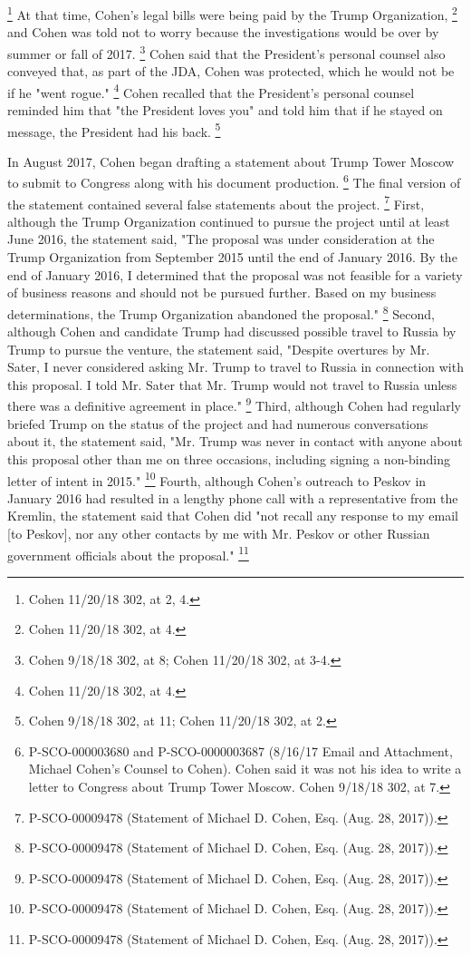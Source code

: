 {\footnote{Cohen 11/20/18 302, at 2, 4.}
At that time, Cohen's legal bills were being paid by the Trump Organization,%
\footnote{Cohen 11/20/18 302, at 4.}
and Cohen was told not to worry because the investigations would be over by summer or fall of 2017.%
\footnote{Cohen 9/18/18 302, at 8;
Cohen 11/20/18 302, at 3-4.}
Cohen said that the President's personal counsel also conveyed that, as part of the JDA, Cohen was protected, which he would not be if he "went rogue."%
\footnote{Cohen 11/20/18 302, at 4.}
Cohen recalled that the President's personal counsel reminded him that "the President loves you" and told him that if he stayed on message, the President had his back.%
\footnote{Cohen 9/18/18 302, at 11;
Cohen 11/20/18 302, at 2.}

In August 2017, Cohen began drafting a statement about Trump Tower Moscow to submit to Congress along with his document production.%
\footnote{P-SCO-000003680 and P-SCO-0000003687 (8/16/17 Email and Attachment, Michael Cohen’s Counsel to Cohen).
Cohen said it was not his idea to write a letter to Congress about Trump Tower Moscow.
Cohen 9/18/18 302, at 7.}
The final version of the statement contained several false statements about the project.%
\footnote{P-SCO-00009478 (Statement of Michael D. Cohen, Esq. (Aug. 28, 2017)).}
First, although the Trump Organization continued to pursue the project until at least June 2016, the statement said, "The proposal was under consideration at the Trump Organization from September 2015 until the end of January 2016.
By the end of January 2016, I determined that the proposal was not feasible for a variety of business reasons and should not be pursued further.
Based on my business determinations, the Trump Organization abandoned the proposal."%
\footnote{P-SCO-00009478 (Statement of Michael D. Cohen, Esq. (Aug. 28, 2017)).}
Second, although Cohen and candidate Trump had discussed possible travel to Russia by Trump to pursue the venture, the statement said, "Despite overtures by Mr. Sater, I never considered asking Mr. Trump to travel to Russia in connection with this proposal.
I told Mr. Sater that Mr. Trump would not travel to Russia unless there was a definitive agreement in place."%
\footnote{P-SCO-00009478 (Statement of Michael D. Cohen, Esq. (Aug. 28, 2017)).}
Third, although Cohen had regularly briefed Trump on the status of the project and had numerous conversations about it, the statement said, "Mr. Trump was never in contact with anyone about this proposal other than me on three occasions, including signing a non-binding letter of intent in 2015."%
\footnote{P-SCO-00009478 (Statement of Michael D. Cohen, Esq. (Aug. 28, 2017)).}
Fourth, although Cohen's outreach to Peskov in January 2016 had resulted in a lengthy phone call with a representative from the Kremlin, the statement said that Cohen did "not recall any response to my email [to Peskov], nor any other contacts by me with Mr. Peskov or other Russian government officials about the proposal."%
\footnote{P-SCO-00009478 (Statement of Michael D. Cohen, Esq. (Aug. 28, 2017)).}

}
